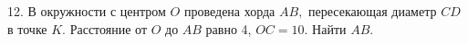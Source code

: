 12. В окружности с центром $O$ проведена хорда $AB,$ пересекающая диаметр $CD$ в точке $K.$ Расстояние от  $O$ до $AB$ равно 4, $OC=10.$ Найти $AB.$\\
